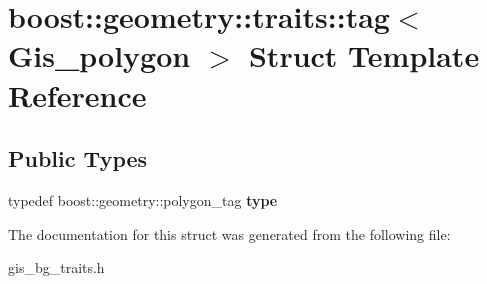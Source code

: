 \hypertarget{structboost_1_1geometry_1_1traits_1_1tag_3_01Gis__polygon_01_4}{}\section{boost\+:\+:geometry\+:\+:traits\+:\+:tag$<$ Gis\+\_\+polygon $>$ Struct Template Reference}
\label{structboost_1_1geometry_1_1traits_1_1tag_3_01Gis__polygon_01_4}
\subsection*{Public Types}
\begin{DoxyCompactItemize}
\item 
\mbox{\label{structboost_1_1geometry_1_1traits_1_1tag_3_01Gis__polygon_01_4_a83236ef11db190a9e841ffad5c46dc72}} 
typedef boost\+::geometry\+::polygon\+\_\+tag {\bfseries type}
\end{DoxyCompactItemize}


The documentation for this struct was generated from the following file\+:\begin{DoxyCompactItemize}
\item 
gis\+\_\+bg\+\_\+traits.\+h\end{DoxyCompactItemize}
